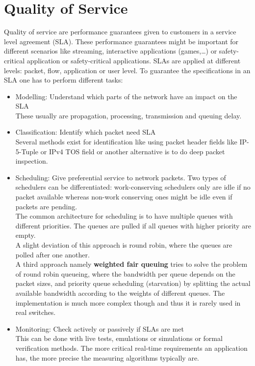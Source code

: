 
\section{Quality of Service}
Quality of service are performance guarantees given to customers in a service level agreement (SLA).
These performance guarantees might be important for different scenarios like streaming, interactive applications (games,\dots) or safety-critical application or safety-critical applications.
SLAs are applied at different levels: packet, flow, application or user level.
To guarantee the specifications in an SLA one has to perform different tasks:
\begin{itemize}
  \item Modelling: Understand which parts of the network have an impact on the SLA\\
    These usually are propagation, processing, transmission and queuing delay.
  \item Classification: Identify which packet need SLA\\
    Several methods exist for identification like using packet header fields like IP-5-Tuple or IPv4 TOS field or another alternative is to do deep packet inspection.
  \item Scheduling: Give preferential service to network packets.
    Two types of schedulers can be differentiated: work-conserving schedulers only are idle if no packet available whereas non-work conserving ones might be idle even if packets are pending.\\
    The common architecture for scheduling is to have multiple queues with different priorities.
    The queues are pulled if all queues with higher priority are empty.\\
    A slight deviation of this approach is round robin, where the queues are polled after one another.\\
    A third approach namely \textbf{weighted fair queuing} tries to solve the problem of round robin queueing, where the bandwidth per queue depends on the packet sizes, and priority queue scheduling (starvation) by splitting the actual available bandwidth according to the weights of different queues.
    The implementation is much more complex though and thus it is rarely used in real switches.
  \item Monitoring: Check actively or passively if SLAs are met\\
    This can be done with live tests, emulations or simulations or formal verification methods.
    The more critical real-time requirements an application has, the more precise the measuring algorithms typically are.
\end{itemize}

